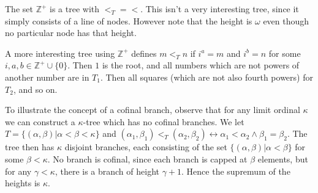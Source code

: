 \documentclass[12pt]{article}
\begin{document}
The set $\mathbb{Z}^+$ is a tree with $<_T=<$.  This isn't a very interesting tree, since it simply consists of a line of nodes.  However note that the height is $\omega$ even though no particular node has that height.

A more interesting tree using $\mathbb{Z}^+$ defines $m<_T n$ if $i^a=m$ and $i^b=n$ for some $i,a,b\in \mathbb{Z}^+\cup \{0\}$.  Then $1$ is the root, and all numbers which are not powers of another number are in $T_1$.  Then all squares (which are not also fourth powers) for $T_2$, and so on.

To illustrate the concept of a cofinal branch, observe that for any limit ordinal $\kappa$ we can construct a $\kappa$-tree which has no cofinal branches.  We let $T=\{(\alpha,\beta)|\alpha<\beta<\kappa\}$ and $(\alpha_1,\beta_1)<_T(\alpha_2,\beta_2)\leftrightarrow \alpha_1<\alpha_2 \wedge \beta_1=\beta_2$.  The tree then has $\kappa$ disjoint branches, each consisting of the set $\{(\alpha,\beta)|\alpha<\beta\}$ for some $\beta<\kappa$.  No branch is cofinal, since each branch is capped at $\beta$ elements, but for any $\gamma<\kappa$, there is a branch of height $\gamma+1$.  Hence the supremum of the heights is $\kappa$.
\end{document}
